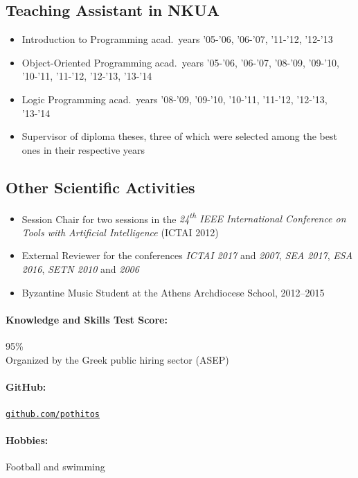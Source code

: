 \documentclass[a4paper]{article}
\begin{document}
\begin{cv}{}
\subsection*{Teaching Assistant in NKUA}
\begin{itemize}
  \item \textsf{Introduction to Programming} acad.\ years
        '05-'06, '06-'07, '11-'12, '12-'13
  \item \textsf{Object-Oriented Programming} acad.\ years
        '05-'06, '06-'07, '08-'09, '09-'10, '10-'11,
        '11-'12, '12-'13, '13-'14
  \item \textsf{Logic Programming} acad.\ years '08-'09,
        '09-'10, '10-'11, '11-'12, '12-'13, '13-'14
  \item \textsf{Supervisor} of diploma theses, three of
        which were selected among the best ones in their
        respective years
\end{itemize}

\subsection*{Other Scientific Activities}
\begin{itemize}
  \item \textsf{Session Chair} for two sessions in the
        \emph{24\textsuperscript{th} IEEE International
        Conference on Tools with Artificial Intelligence}
        (ICTAI 2012)
  \item \textsf{External Reviewer} for the conferences
        \emph{ICTAI 2017} and \emph{2007}, \emph{SEA 2017},
        \emph{ESA 2016}, \emph{SETN 2010} and \emph{2006}
  \item \textsf{Byzantine Music Student} at the Athens
         Archdiocese School, 2012--2015
\end{itemize}

\paragraph{Knowledge and Skills Test Score:} 95\% \\
Organized by the Greek public hiring sector (ASEP)

\paragraph{GitHub:}
\href{https://github.com/pothitos}{\texttt{github.com/pothitos}}

\paragraph{Hobbies:} Football and swimming

\date{}

\end{cv}
\end{document}
